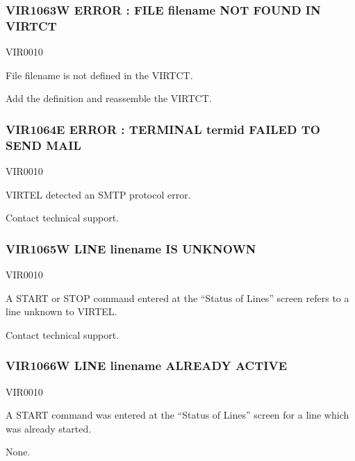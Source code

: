 \documentclass[letterpaper,10pt,english]{sphinxmanual}
\begin{document}
\subsubsection{VIR1063W ERROR : FILE filename NOT FOUND IN VIRTCT}
\label{\detokenize{messages:vir1063w-error-file-filename-not-found-in-virtct}}\begin{description}
\sphinxAtStartPar
VIR0010

\sphinxAtStartPar
File filename is not defined in the VIRTCT.

\sphinxAtStartPar
Add the definition and reassemble the VIRTCT.

\end{description}


\subsubsection{VIR1064E ERROR : TERMINAL termid FAILED TO SEND MAIL}
\label{\detokenize{messages:vir1064e-error-terminal-termid-failed-to-send-mail}}\begin{description}
\sphinxAtStartPar
VIR0010

\sphinxAtStartPar
VIRTEL detected an SMTP protocol error.

\sphinxAtStartPar
Contact technical support.

\end{description}


\subsubsection{VIR1065W LINE linename IS UNKNOWN}
\label{\detokenize{messages:vir1065w-line-linename-is-unknown}}\begin{description}
\sphinxAtStartPar
VIR0010

\sphinxAtStartPar
A START or STOP command entered at the “Status of Lines” screen refers to a line unknown to VIRTEL.

\sphinxAtStartPar
Contact technical support.

\end{description}


\subsubsection{VIR1066W LINE linename ALREADY ACTIVE}
\label{\detokenize{messages:vir1066w-line-linename-already-active}}\begin{description}
\sphinxAtStartPar
VIR0010

\sphinxAtStartPar
A START command was entered at the “Status of Lines” screen for a line which was already started.

\sphinxAtStartPar
None.

\end{description}
\end{document}
